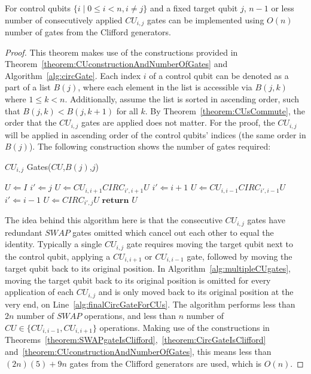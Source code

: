 \begin{theorem}
\label{theorem:multipleCuGates}
For control qubits $\{i \mid 0 \leq i < n, i \neq j\}$ and a fixed target qubit $j$, $n-1$ or less number of consecutively applied $\mathit{CU}_{i,j}$ gates can be implemented using $O \left(n \right)$ number of gates from the Clifford generators.
\end{theorem}
\begin{proof}
This theorem makes use of the constructions provided in Theorem~\ref{theorem:CUconstructionAndNumberOfGates} and Algorithm~\ref{alg:circGate}. Each index $i$ of a control qubit can be denoted as a part of a list $B(j)$, where each element in the list is accessible via $B(j,k)$ where $1 \leq k < n$. Additionally, assume the list is sorted in ascending order, such that $B(j,k) < B(j,k+1)$ for all $k$. By Theorem~\ref{theorem:CUsCommute}, the order that the $\mathit{CU}_{i,j}$ gates are applied does not matter. For the proof, the $\mathit{CU}_{i,j}$ will be applied in ascending order of the control qubits' indices (the same order in $B(j)$). The following construction shows the number of gates required:
\begin{algorithm}[H]
  \caption{$\mathit{CU}_{i,j}$ Gates($\mathit{CU}$,$B(j)$,$j$)}  \label{alg:multipleCUgates}
  \begin{algorithmic}[1]
  \State $U \Longleftarrow I$
  \State $i' \Longleftarrow j$
    \State $U \Longleftarrow \mathit{CU}_{i,i+1}\mathit{CIRC}_{i',i+1}U$
    \State $i' \Longleftarrow i+1$
  \EndFor
    \State $U \Longleftarrow \mathit{CU}_{i,i-1}\mathit{CIRC}_{i',i-1}U$
    \State $i' \Longleftarrow i-1$
  \EndFor
  \State $U \Longleftarrow \mathit{CIRC}_{i',j}U$ \label{alg:finalCircGateForCUs}
  \State $\mathbf{return}$ $U$
  \end{algorithmic}
\end{algorithm}
The idea behind this algorithm here is that the consecutive $\mathit{CU}_{i,j}$ gates have redundant $\mathit{SWAP}$ gates omitted which cancel out each other to equal the identity. Typically a single $\mathit{CU}_{i,j}$ gate requires moving the target qubit next to the control qubit, applying a $\mathit{CU}_{i,i+1}$ or $\mathit{CU}_{i,i-1}$ gate, followed by moving the target qubit back to its original position. In Algorithm~\ref{alg:multipleCUgates}, moving the target qubit back to its original position is omitted for every application of each $\mathit{CU}_{i,j}$ and is only moved back to its original position at the very end, on Line~\ref{alg:finalCircGateForCUs}. The algorithm performs less than $2n$ number of $\mathit{SWAP}$ operations, and less than $n$ number of $\mathit{CU} \in \{\mathit{CU}_{i,i-1}, \mathit{CU}_{i,i+1}\}$ operations. Making use of the constructions in Theorems~\ref{theorem:SWAPgateIsClifford},~\ref{theorem:CircGateIsClifford} and~\ref{theorem:CUconstructionAndNumberOfGates}, this means less than $(2n)(5) + 9n$ gates from the Clifford generators are used, which is $O \left(n \right)$.
\end{proof}

